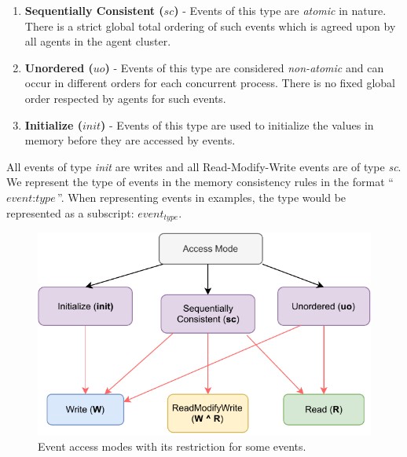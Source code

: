         \begin{enumerate}
            \item \textbf{Sequentially Consistent ($sc$)} - Events of this type are \textit{atomic} in nature\footnotemark. There is a strict global total ordering of such events which is agreed upon by all agents in the agent cluster. 
            
            \item \textbf{Unordered ($uo$)} - Events of this type are considered \textit{non-atomic} and can occur in different orders for each concurrent process. There is no fixed global order respected by agents for such events. 
            
            \item \textbf{Initialize ($init$)} - Events of this type are used to initialize the values in memory before they are accessed by events. 
        \end{enumerate}

        All events of type \textit{init} are writes and all Read-Modify-Write events are of type \textit{sc}.  
        We represent the type of events in the memory consistency rules in the format ``$\textit{event} : \textit{type}$''. 
        When representing events in examples, the type would be represented as a subscript: $\textit{event}_\textit{type}$. 
       
        \begin{figure}[H]
            \centering
            \includegraphics[scale=0.7]{4.ECMAScriptMemoryModel/AccessModes.pdf}
            \caption{Event access modes with its restriction for some events.}
        \end{figure}


